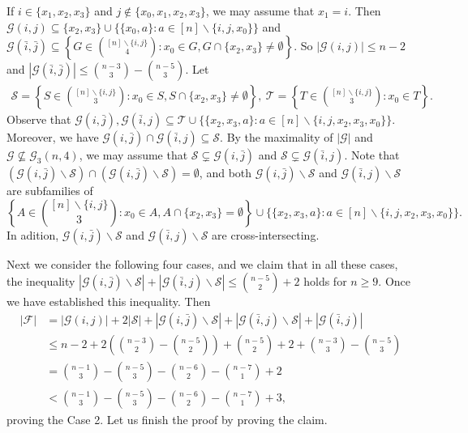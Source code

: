 \documentclass[11pt]{article}
\numberwithin{equation}{section}
\begin{document}
If $i\in \{x_1, x_2, x_3\}$ and $j \notin \{x_0, x_1, x_2, x_3\}$, we may assume that $x_1=i$. Then $\mathcal{G}(i,j)\subseteq\{x_2,x_3\}\cup\{ \{x_0,a\}:a\in [n]\backslash\{i, j, x_0\}\}$ and
$
\mathcal{G}(\bar{i},\bar{j}) \subseteq\left\{G \in\binom{[n]\backslash \{i,j\}}{4}: x_0\in G, G\cap\{x_2,x_3\} \neq \emptyset\right\}
$.
So $|\mathcal{G}(i,j)|\leq n-2$ and  $|\mathcal{G}(\bar{i},\bar{j})|\leq \binom{n-3}{3}-\binom{n-5}{3}$.
Let
\begin{align*}
\mathcal{S}=\left\{S \in\binom{[n]\backslash \{i,j\}}{3}: x_0\in S, S\cap\{x_2,x_3\} \neq \emptyset\right\},~\mathcal{T}=\left\{T \in\binom{[n]\backslash \{i,j\}}{3}: x_0\in T\right\}.
\end{align*}
Observe that
$\mathcal{G}(i,\bar{j}), \mathcal{G}(\bar{i},j) \subseteq \mathcal{T}\cup \{\{x_2, x_3, a\}:a\in [n]\backslash\{i, j, x_2,x_3,x_0\}\}$.
Moreover, we have $\mathcal{G}(i,\bar{j})\cap \mathcal{G}(\bar{i},j)\subseteq \mathcal{S}$. By the maximality of $|\mathcal{G}|$ and $\mathcal{G} \nsubseteq\mathcal{G}_3(n, 4)$, we may assume that $\mathcal{S}\subsetneq \mathcal{G}(i,\bar{j})$ and 
$\mathcal{S}\subsetneq \mathcal{G}(\bar{i},j)$. 
Note that $(\mathcal{G}(i,\bar{j})\backslash\mathcal{S}) \cap(\mathcal{G}(i,\bar{j})\backslash\mathcal{S}) =\emptyset$, and both 
$\mathcal{G}(i,\bar{j})\backslash\mathcal{S} $ and $ \mathcal{G}(\bar{i},j) \backslash\mathcal{S}$ are subfamilies of 
$$
\left\{A \in\binom{[n]\backslash \{i,j\}}{3}: x_0\in A, A\cap\{x_2,x_3\} 
= \emptyset\right\}
\cup \{\{x_2, x_3, a\}:a\in [n]\backslash\{i, j, x_2,x_3,x_0\}\}
.$$
In adition,  $\mathcal{G}(i,\bar{j})\backslash\mathcal{S}$ and $\mathcal{G}(\bar{i},j)\backslash\mathcal{S}$ are cross-intersecting.

Next we consider the following four cases, and we claim that in all these cases, the inequality
$|\mathcal{G}(i,\bar{j})\backslash\mathcal{S}|+|\mathcal{G}(\bar{i},j)\backslash\mathcal{S}|\leq \binom{n-5}{2}+2$
holds for $n\geq 9$. Once we have established this inequality. Then
\begin{align*}
|\mathcal{F}|&=|\mathcal{G}(i,j)|+2|\mathcal{S}|+|\mathcal{G}(i,\bar{j})\backslash\mathcal{S}|+|\mathcal{G}(\bar{i},j)\backslash\mathcal{S}|+|\mathcal{G}(\bar{i}, j)|\\
&\leq n-2+2\left(\binom{n-3}{2}- \binom{n-5}{2}\right)+\binom{n-5}{2}+2+ \binom{n-3}{3}-\binom{n-5}{3}\\
&=\binom{n-1}{3}-\binom{n-5}{3}-\binom{n-6}{2}-\binom{n-7}{1}+2\\
&<\binom{n-1}{3}-\binom{n-5}{3}-\binom{n-6}{2}-\binom{n-7}{1}+3,
\end{align*}
proving the Case 2. Let us finish the proof by proving the claim.
\end{document}

